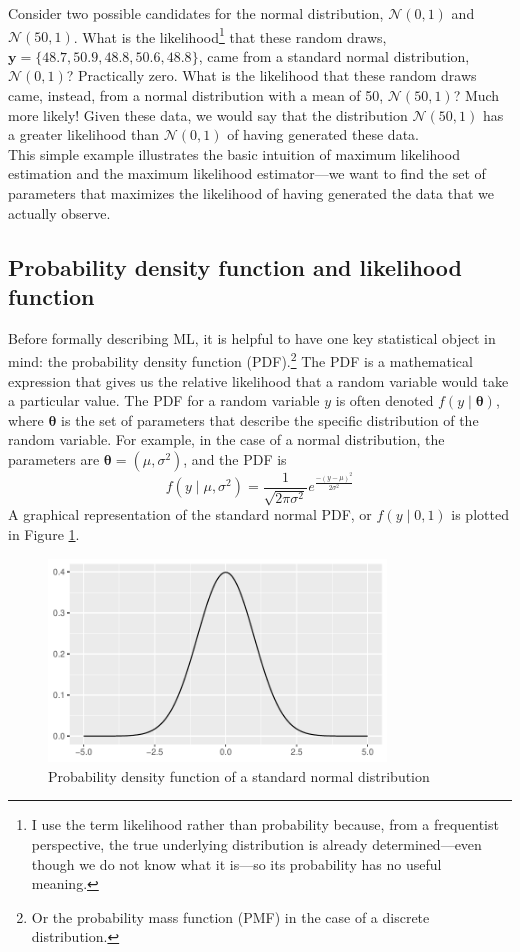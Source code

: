 \documentclass[11pt,letterpaper]{article}
\begin{document}
\noindent Consider two possible candidates for the normal distribution, $\mathcal{N}(0, 1)$ and $\mathcal{N}(50, 1)$. What is the likelihood\footnote{I use the term likelihood rather than probability because, from a frequentist perspective, the true underlying distribution is already determined---even though we do not know what it is---so its probability has no useful meaning.} that these random draws, $\bm{y} = \{48.7, 50.9, 48.8, 50.6, 48.8\}$, came from a standard normal distribution, $\mathcal{N}(0, 1)$? Practically zero. What is the likelihood that these random draws came, instead, from a normal distribution with a mean of 50, $\mathcal{N}(50, 1)$? Much more likely! Given these data, we would say that the distribution $\mathcal{N}(50, 1)$ has a greater likelihood than $\mathcal{N}(0, 1)$ of having generated these data. \\ 

\noindent This simple example illustrates the basic intuition of maximum likelihood estimation and the maximum likelihood estimator---we want to find the set of parameters that maximizes the likelihood of having generated the data that we actually observe.

\subsection{Probability density function and likelihood function}

Before formally describing ML, it is helpful to have one key statistical object in mind: the probability density function (PDF).\footnote{Or the probability mass function (PMF) in the case of a discrete distribution.} The PDF is a mathematical expression that gives us the relative likelihood that a random variable would take a particular value. The PDF for a random variable $y$ is often denoted $f(y \mid \bm{\theta})$, where $\bm{\theta}$ is the set of parameters that describe the specific distribution of the random variable. For example, in the case of a normal distribution, the parameters are $\bm{\theta} = \left( \mu, \sigma^2 \right)$, and the PDF is
$$f(y \mid \mu, \sigma^2) = \frac{1}{\sqrt{2 \pi \sigma^2}} e^{\frac{-(y - \mu)^2}{2 \sigma^2}}$$
A graphical representation of the standard normal PDF, or $f(y \mid 0, 1)$ is plotted in Figure \ref{fig:norm_pdf}.

\begin{figure}[htbp]
  \caption{Probability density function of a standard normal distribution}
  \label{fig:norm_pdf}
  \centering
  \includegraphics[width=0.8\textwidth]{norm_pdf.pdf}
\end{figure}
\end{document}
